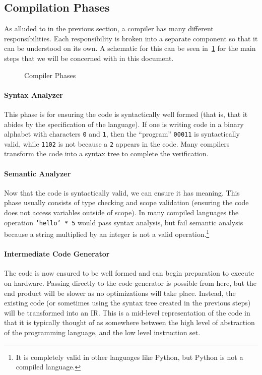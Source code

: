 \subsection{Compilation Phases}\label{sec:comp-phases}

As alluded to in the previous section, a compiler has many different responsibilities.
Each responsibility is broken into a separate component so that it can be understood on its own.
A schematic for this can be seen in~\cref{fig:compilerphases} for the main steps that we will be concerned with in this document.
\begin{figure}%
    \centering
    
    \caption{Compiler Phases}\label{fig:compilerphases} %
\end{figure}

\paragraph{Syntax Analyzer}
This phase is for ensuring the code is syntactically well formed (that is, that it abides by the specification of the language).
If one is writing code in a binary alphabet with characters \texttt{0} and \texttt{1}, then the ``program'' \texttt{00011} is syntactically valid, while \texttt{1102} is not because a \texttt{2} appears in the code.
Many compilers transform the code into a syntax tree to complete the verification.

\paragraph{Semantic Analyzer}
Now that the code is syntactically valid, we can ensure it has meaning.
This phase usually consists of type checking and scope validation (ensuring the code does not access variables outside of scope).
In many compiled languages the operation \texttt{'hello' * 5} would pass syntax analysis, but fail semantic analysis because a string multiplied by an integer is not a valid operation.\footnote{It is completely valid in other languages like Python, but Python is not a compiled language.}

\paragraph{Intermediate Code Generator}
The code is now ensured to be well formed and can begin preparation to execute on hardware.
Passing directly to the code generator is possible from here, but the end product will be slower as no optimizations will take place.
Instead, the existing code (or sometimes using the syntax tree created in the previous steps) will be transformed into an \acf{IR}.
This is a mid-level representation of the code in that it is typically thought of as somewhere between the high level of abstraction of the programming language, and the low level instruction set.

